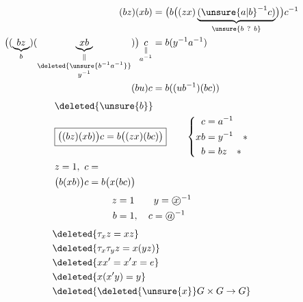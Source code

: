 \[
\begin{aligned}
(bz)(xb)&=\bigl(b\bigl((zx)\underbrace{({\unsure{a|b}}^{-1}c)}_{\unsure{b\ ?\ b}}\bigr)\bigr)c^{-1}\\
\bigl((\underbrace{bz}_{b})(\underbrace{xb}_{\substack{\|\\\deleted{\unsure{b^{-1}a^{-1}}}\\y^{-1}}})\bigr)\underset{\substack{\|\\a^{-1}}}{c}&=b(y^{-1}a^{-1})\\
(bu)c&=b((ub^{-1})(bc))
\end{aligned}
\]
\[
\begin{aligned}
&\deleted{\unsure{b}}\\
&\boxed{\bigl((bz)(xb)\bigr)c=b\bigl((zx)(bc)\bigr)}
\qquad\left\{\begin{aligned}c&=a^{-1}\\xb&=y^{-1}\quad *\\ b&=bz\quad *\end{aligned}\right.\\
&z=1,\ c=\\
&\bigl(b(xb)\bigr)c=b\bigl(x(bc)\bigr)
\end{aligned}
\]
\[
\begin{aligned}
z&=1\qquad y={\text{\textcircled{$x$}}}^{-1}\\
b&=1,\quad c={\text{\textcircled{$a$}}}^{-1}
\end{aligned}
\]
\[
\begin{aligned}
&\deleted{\tau_x z=xz}\\
&\deleted{\tau_x\tau_y z=x(yz)}\\
&\deleted{xx'=x'x=e}\\
&\deleted{x(x'y)=y}\\
&\deleted{\deleted{\unsure{x}}G\times G\to G}
\end{aligned}
\]

